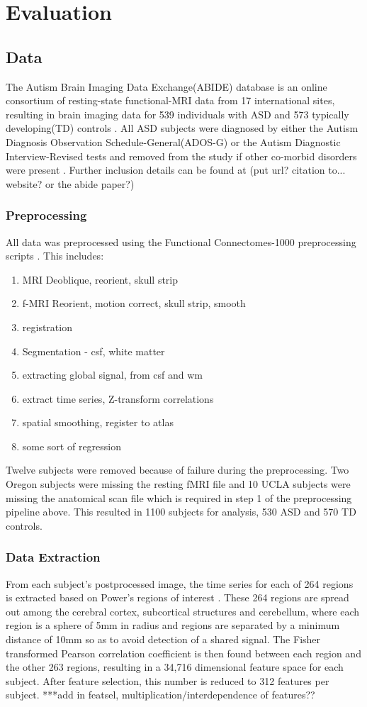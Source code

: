\documentclass{llncs}
\begin{document}
\section{Evaluation}
\subsection{Data}
The Autism Brain Imaging Data Exchange(ABIDE) database is an online consortium of resting-state functional-MRI data from 17 international sites, resulting in brain imaging data for 539 individuals with ASD and 573 typically developing(TD)  controls \cite{abide}. All ASD subjects were diagnosed by either the Autism Diagnosis Observation Schedule-General(ADOS-G) or the Autism Diagnostic Interview-Revised tests and removed from the study if other co-morbid disorders were present \cite{lordADOS} \cite{lordADIR} \cite{abide}.  Further inclusion details can be found at (put url? citation to... website? or the abide paper?)
\subsubsection{Preprocessing}
All data was preprocessed using the Functional Connectomes-1000 preprocessing scripts \cite{fcon}. This includes:
\begin{enumerate}
\item MRI Deoblique, reorient, skull strip
\item f-MRI Reorient, motion correct, skull strip, smooth
\item registration
\item Segmentation - csf, white matter
\item extracting global signal, from csf and wm
\item extract time series, Z-transform correlations
\item spatial smoothing, register to atlas
\item some sort of regression
\end{enumerate}
Twelve subjects were removed because of failure during the preprocessing.  Two Oregon subjects were missing the resting fMRI file and 10 UCLA subjects were missing the anatomical scan file which is required in step 1 of the preprocessing pipeline above. This resulted in 1100 subjects for analysis, 530 ASD and 570 TD controls.
\subsubsection{Data Extraction}
From each subject's postprocessed image, the time series for each of 264 regions is extracted based on Power's regions of interest \cite{Powers}. These 264 regions are spread out among the cerebral cortex, subcortical structures and cerebellum, where each region is a sphere of 5mm in radius and regions are separated by a minimum distance of 10mm so as to avoid detection of a shared signal. The Fisher transformed Pearson correlation coefficient is then found between each region and the other 263 regions, resulting in a 34,716 dimensional feature space for each subject. After feature selection, this number is reduced to 312 features per subject.
***add in featsel, multiplication/interdependence of features??
\end{document}
